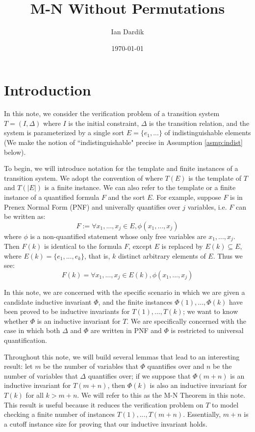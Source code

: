 \documentclass[12pt]{article}
\title{M-N Without Permutations}
\author{Ian Dardik}
\date{\today}
\theoremstyle{definition}
\theoremstyle{remark}
\begin{document}
\maketitle

\section{Introduction}
In this note, we consider the verification problem of a transition system $T=(I,\Delta)$ where $I$ is the initial constraint, $\Delta$ is the transition relation, and the system is parameterized by a single sort $E=\{e_1,...\}$ of indistinguishable elements (We make the notion of ``indistinguishable" precise in Assumption \ref{asmp:indist} below).  

To begin, we will introduce notation for the template and finite instances of a transition system.  We adopt the convention of \cite{goel2021symmetry} where $T(E)$ is the template of $T$ and $T(|E|)$ is a finite instance.  We can also refer to the template or a finite instance of a quantified formula $F$ and the sort $E$.  For example, suppose $F$ is in Prenex Normal Form (PNF) and univerally quantifies over $j$ variables, i.e. $F$ can be written as:
$$F := \forall x_1,...,x_j \in E, \phi(x_1,...,x_j)$$
where $\phi$ is a non-quantified statement whose only free variables are $x_1,...,x_j$.  Then $F(k)$ is identical to the formula $F$, except $E$ is replaced by $E(k) \subseteq E$, where $E(k)=\{e_1,...,e_k\}$, that is, $k$ distinct arbitrary elements of $E$.  Thus we see:
$$F(k) = \forall x_1,...,x_j \in E(k), \phi(x_1,...,x_j)$$

In this note, we are concerned with the specific scenario in which we are given a candidate inductive invariant $\Phi$, and the finite instances $\Phi(1),...,\Phi(k)$ have been proved to be inductive invariants for $T(1),...,T(k)$; we want to know whether $\Phi$ is an inductive invariant for $T$.  We are specifically concerned with the case in which both $\Delta$ and $\Phi$ are written in PNF and $\Phi$ is restricted to universal quantification.

Throughout this note, we will build several lemmas that lead to an interesting result: let $m$ be the number of variables that $\Phi$ quantifies over and $n$ be the number of variables that $\Delta$ quantifies over; if we suppose that $\Phi(m+n)$ is an inductive invariant for $T(m+n)$, then $\Phi(k)$ is also an inductive invariant for $T(k)$ for all $k>m+n$.  We will refer to this as the M-N Theorem in this note.  This result is useful because it reduces the verification problem on $T$ to model checking a finite number of instances $T(1),...,T(m+n)$.  Essentially, $m+n$ is a cutoff instance size for proving that our inductive invariant holds.
\end{document}
